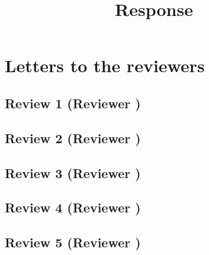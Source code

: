 \documentclass{article}
\title{Response}
\begin{document}
\maketitle
\section{Letters to the reviewers}
\subsection{Review 1 (Reviewer )}
\subsection{Review 2 (Reviewer )}
\subsection{Review 3 (Reviewer )}
\subsection{Review 4 (Reviewer )}
\subsection{Review 5 (Reviewer )}
\end{document}
